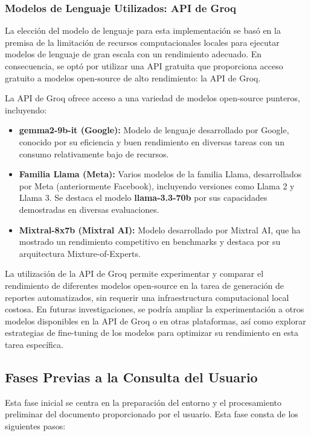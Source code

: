\subsubsection{Modelos de Lenguaje Utilizados: API de Groq}

La elección del modelo de lenguaje para esta implementación se basó en la premisa de la limitación de recursos computacionales locales para ejecutar modelos de lenguaje de gran escala con un rendimiento adecuado.  En consecuencia,  se optó por utilizar una API gratuita que proporciona acceso gratuito a modelos open-source de alto rendimiento: la API de Groq\cite{groq}.

La API de Groq ofrece acceso a una variedad de modelos open-source punteros,  incluyendo:

\begin{itemize}
	\item \textbf{gemma2-9b-it (Google):}  Modelo de lenguaje desarrollado por Google,  conocido por su eficiencia y buen rendimiento en diversas tareas con un consumo relativamente bajo de recursos.
	\item \textbf{Familia Llama (Meta):}  Varios modelos de la familia Llama,  desarrollados por Meta (anteriormente Facebook),  incluyendo versiones como Llama 2 y Llama 3.  Se destaca el modelo \textbf{llama-3.3-70b} por sus capacidades demostradas en diversas evaluaciones\cite{llamavsgpt4}.
	\item \textbf{Mixtral-8x7b (Mixtral AI):}  Modelo desarrollado por Mixtral AI,  que ha mostrado un rendimiento competitivo en benchmarks y destaca por su arquitectura Mixture-of-Experts.
\end{itemize}

La utilización de la API de Groq permite experimentar y comparar el rendimiento de diferentes modelos open-source en la tarea de generación de reportes automatizados,  sin requerir una infraestructura computacional local costosa. En futuras investigaciones,  se podría ampliar la experimentación a otros modelos disponibles en la API de Groq o en otras plataformas,  así como explorar estrategias de fine-tuning de los modelos para optimizar su rendimiento en esta tarea específica.


\subsection{Fases Previas a la Consulta del Usuario}

Esta fase inicial se centra en la preparación del entorno y el procesamiento preliminar del documento proporcionado por el usuario. Esta fase consta de los siguientes pasos:

